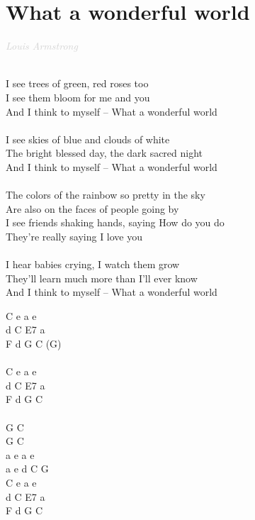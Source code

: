 \documentclass[a5paper, 10pt]{book}
\begin{document}
\section{What a wonderful world}\textcolor{lightgray}{\textit{Louis Armstrong}}\\~\\
\begin{minipage}[t]{0.8\textwidth}
I see trees of green, red roses too\\
I see them bloom for me and you\\
And I think to myself – What a wonderful world \\
\\
I see skies of blue and clouds of white\\
The bright blessed day, the dark sacred night\\
And I think to myself – What a wonderful world\\
\\
\hspace*{5mm}The colors of the rainbow so pretty in the sky\\
\hspace*{5mm}Are also on the faces of people going by\\
\hspace*{5mm}I see friends shaking hands, saying How do you do \\
\hspace*{5mm}They’re really saying I love you \\
\\
I hear babies crying, I watch them grow\\
They’ll learn much more than I’ll ever know\\
And I think to myself – What a wonderful world\\
\end{minipage}
\begin{minipage}[t]{0.2\textwidth}
 C e a e\\
 d C E7 a\\
F d G C (G)\\
\\
 C e a e\\
 d C E7 a\\
 F d G C\\
 \\
 G C\\
 G C\\
a e a e\\
a e d C G\\

 C e a e\\
 d C E7 a\\
 F d G C\\
\end{minipage}
\end{document}
